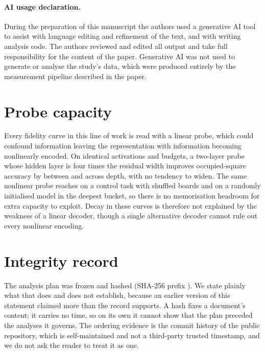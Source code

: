 \documentclass[11pt]{article}
\begin{document}
\paragraph{AI usage declaration.}
During the preparation of this manuscript the authors used a generative AI tool to
assist with language editing and refinement of the text, and with writing analysis
code. The authors reviewed and edited all output and take full responsibility for
the content of the paper. Generative AI was not used to generate or analyse the
study's data, which were produced entirely by the measurement pipeline described in
the paper.

\appendix

\section{Probe capacity}
\label{app:capacity}

Every fidelity curve in this line of work is read with a linear probe, which could
confound information leaving the representation with information becoming
nonlinearly encoded. On identical activations and budgets, a two-layer probe whose
hidden layer is four times the residual width improves occupied-square accuracy by
between
 and  across depth, with no tendency to widen.
The same nonlinear probe reaches  on a control task with
shuffled boards and  on a randomly initialised model in the
deepest bucket, so there is no memorisation headroom for extra capacity to exploit.
Decay in these curves is therefore not explained by the weakness of a linear
decoder, though a single alternative decoder cannot rule out every nonlinear
encoding.

\section{Integrity record}
\label{app:integrity}

The analysis plan was frozen and hashed (SHA-256 prefix \texttt{}).
We state plainly what that does and does not establish, because an earlier version of
this statement claimed more than the record supports. A hash fixes a document's
content; it carries no time, so on its own it cannot show that the plan preceded the
analyses it governs. The ordering evidence is the commit history of the public
repository, which is self-maintained and not a third-party trusted timestamp, and we
do not ask the reader to treat it as one.
\end{document}

